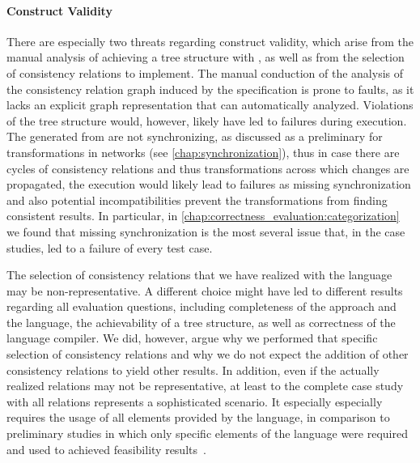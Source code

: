 \paragraph{Construct Validity}
There are especially two threats regarding construct validity, which arise from the manual analysis of achieving a tree structure with \commonalities, as well as from the selection of consistency relations to implement.
The manual conduction of the analysis of the consistency relation graph induced by the \commonalities specification is prone to faults, as it lacks an explicit graph representation that can automatically analyzed.
Violations of the tree structure would, however, likely have led to failures during execution.
The \reactions generated from \commonalities are not synchronizing, as discussed as a preliminary for transformations in networks (see \autoref{chap:synchronization}), thus in case there are cycles of consistency relations and thus transformations across which changes are propagated, the execution would likely lead to failures as missing synchronization and also potential incompatibilities prevent the transformations from finding consistent results.
In particular, in \autoref{chap:correctness_evaluation:categorization} we found that missing synchronization is the most several issue that, in the case studies, led to a failure of every test case.

The selection of consistency relations that we have realized with the \commonalities language may be non-representative.
A different choice might have led to different results regarding all evaluation questions, including completeness of the approach and the language, the achievability of a tree structure, as well as correctness of the language compiler.
We did, however, argue why we performed that specific selection of consistency relations and why we do not expect the addition of other consistency relations to yield other results.
In addition, even if the actually realized relations may not be representative, at least to the complete case study with all relations represents a sophisticated scenario.
It especially especially requires the usage of all elements provided by the \commonalities language, in comparison to preliminary studies in which only specific elements of the language were required and used to achieved feasibility results~.


